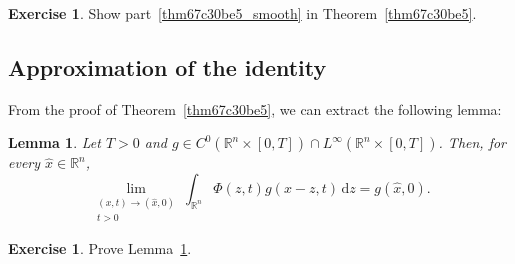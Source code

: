 \documentclass[a4paper,9pt]{amsart}
\newcommand{\R}{\mathbb{R}}	%
\newcommand{\did}{\,\mathrm{d}}	%
\theoremstyle{plain}
\newtheorem{lemma}[proposition]{Lemma}
\theoremstyle{definition}
\newtheorem{exercise}[proposition]{Exercise}%
\theoremstyle{remark}
\begin{document}
\begin{exercise}\label{exr67c33c9d}
	Show part~\ref{thm67c30be5_smooth} in Theorem~\ref{thm67c30be5}.
\end{exercise}

\subsection{Approximation of the identity}\label{subs67c41af0}
From the proof of Theorem~\ref{thm67c30be5}, we can extract the following lemma:
\begin{lemma}\label{lem67c41d25}
	Let $T>0$ and $g\in C^0(\R^n\times[0,T])\cap L^\infty(\R^n\times[0,T])$.
	Then, for every $\hat x\in\R^n$,
	\begin{equation}\label{eq67c41b8a}
		\lim_{\substack{(x,t)\to(\hat x,0)\\t>0}}
		\int_{\R^n} \Phi(z,t) g( x - z,t) \did z = g(\hat x,0) .
	\end{equation}
\end{lemma}
\begin{exercise}
	Prove Lemma~\ref{lem67c41d25}.
\end{exercise}
\end{document}
